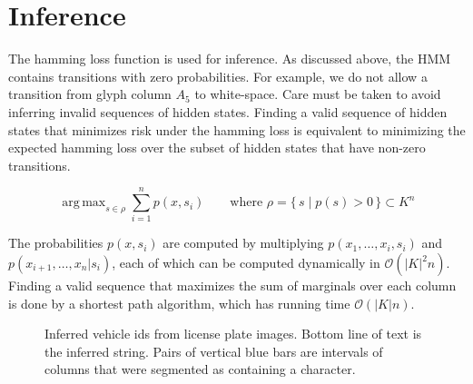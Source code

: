 \documentclass[a4paper,12pt]{article}
\DeclareMathOperator*{\argmax}{arg\,max}
\begin{document}
\section{Inference}
The hamming loss function is used for inference. As discussed above,
the HMM contains transitions with zero probabilities. For example, we
do not allow a transition from glyph column $A_5$ to white-space.
Care must be taken to avoid inferring invalid sequences of hidden
states.  Finding a valid sequence of hidden states that minimizes risk
under the hamming loss is equivalent to minimizing the expected
hamming loss over the subset of hidden states that have non-zero
transitions.  

\[ 
\argmax_{s \in \rho} \sum_{i=1}^n p(x,s_i) \qquad \text{where } \rho =
       \{\, s \mid p(s) > 0 \,\} \subset K^n
\]

The probabilities $p(x,s_i)$ are computed by multiplying
$p(x_1,\ldots,x_i,s_i)$ and $p(x_{i+1},\ldots,x_n|s_i)$, each of which
can be computed dynamically in $\mathcal{O}(|K|^2n)$. Finding a valid
sequence that maximizes the sum of marginals over each column is done
by a shortest path algorithm, which has running time
$\mathcal{O}(|K|n)$.
 
\begin{figure}[h]
  \centering
  \caption{Inferred vehicle ids from license plate images. Bottom
    line of text is the inferred string. Pairs of vertical blue bars
    are intervals of columns that were segmented as containing a
    character.}
  \label{fig:inferred-strings}
\end{figure}
\end{document}
